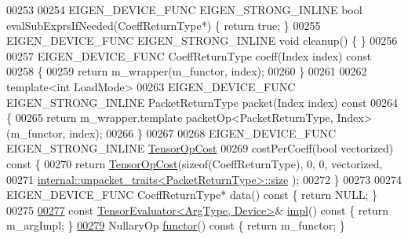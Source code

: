 \begin{DoxyCode}
00253 
00254   EIGEN\_DEVICE\_FUNC EIGEN\_STRONG\_INLINE \textcolor{keywordtype}{bool} evalSubExprsIfNeeded(CoeffReturnType*) \{ \textcolor{keywordflow}{return} \textcolor{keyword}{true}; \}
00255   EIGEN\_DEVICE\_FUNC EIGEN\_STRONG\_INLINE \textcolor{keywordtype}{void} cleanup() \{ \}
00256 
00257   EIGEN\_DEVICE\_FUNC CoeffReturnType coeff(Index index)\textcolor{keyword}{ const}
00258 \textcolor{keyword}{  }\{
00259     \textcolor{keywordflow}{return} m\_wrapper(m\_functor, index);
00260   \}
00261 
00262   \textcolor{keyword}{template}<\textcolor{keywordtype}{int} LoadMode>
00263   EIGEN\_DEVICE\_FUNC EIGEN\_STRONG\_INLINE PacketReturnType packet(Index index)\textcolor{keyword}{ const}
00264 \textcolor{keyword}{  }\{
00265     \textcolor{keywordflow}{return} m\_wrapper.template packetOp<PacketReturnType, Index>(m\_functor, index);
00266   \}
00267 
00268   EIGEN\_DEVICE\_FUNC EIGEN\_STRONG\_INLINE \hyperlink{class_eigen_1_1_tensor_op_cost}{TensorOpCost}
00269   costPerCoeff(\textcolor{keywordtype}{bool} vectorized)\textcolor{keyword}{ const }\{
00270     \textcolor{keywordflow}{return} \hyperlink{class_eigen_1_1_tensor_op_cost}{TensorOpCost}(\textcolor{keyword}{sizeof}(CoeffReturnType), 0, 0, vectorized,
00271                         \hyperlink{struct_eigen_1_1internal_1_1unpacket__traits}{internal::unpacket\_traits<PacketReturnType>::size}
      );
00272   \}
00273 
00274   EIGEN\_DEVICE\_FUNC CoeffReturnType* data()\textcolor{keyword}{ const }\{ \textcolor{keywordflow}{return} NULL; \}
00275 
\hyperlink{struct_eigen_1_1_tensor_evaluator_3_01const_01_tensor_cwise_nullary_op_3_01_nullary_op_00_01_arg_type_01_4_00_01_device_01_4_a72a3fd3dcff859c87f7eb5d634d35f21}{00277}   \textcolor{keyword}{const} \hyperlink{struct_eigen_1_1_tensor_evaluator}{TensorEvaluator<ArgType, Device>}& \hyperlink{struct_eigen_1_1_tensor_evaluator_3_01const_01_tensor_cwise_nullary_op_3_01_nullary_op_00_01_arg_type_01_4_00_01_device_01_4_a72a3fd3dcff859c87f7eb5d634d35f21}{impl}()\textcolor{keyword}{ const }\{ \textcolor{keywordflow}{return} 
      m\_argImpl; \}
\hyperlink{struct_eigen_1_1_tensor_evaluator_3_01const_01_tensor_cwise_nullary_op_3_01_nullary_op_00_01_arg_type_01_4_00_01_device_01_4_a9526ddfd7e9532ffdcb3e3ff8defb11f}{00279}   NullaryOp \hyperlink{struct_eigen_1_1_tensor_evaluator_3_01const_01_tensor_cwise_nullary_op_3_01_nullary_op_00_01_arg_type_01_4_00_01_device_01_4_a9526ddfd7e9532ffdcb3e3ff8defb11f}{functor}()\textcolor{keyword}{ const }\{ \textcolor{keywordflow}{return} m\_functor; \}

\end{DoxyCode}
